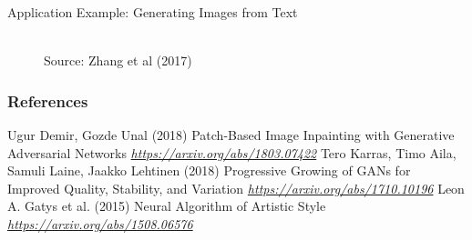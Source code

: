  \begin{frame} {Application Example: Generating Images from Text}
   
     \begin{figure}
     \centering
     \tiny{\\Source: Zhang et al (2017)}
     \end{figure}

 \end{frame}




\begin{vbframe}
\frametitle{References}
\footnotesize{
\begin{thebibliography}{99}
 Ugur Demir, Gozde Unal (2018)
\newblock Patch-Based Image Inpainting with Generative Adversarial Networks
\newblock \emph{\url{https://arxiv.org/abs/1803.07422}}
 Tero Karras, Timo Aila, Samuli Laine, Jaakko Lehtinen (2018)
\newblock Progressive Growing of GANs for Improved Quality, Stability, and Variation
\newblock \emph{\url{https://arxiv.org/abs/1710.10196}}
 Leon A. Gatys et al. (2015)
\newblock Neural Algorithm of Artistic Style
\newblock \emph{\url{https://arxiv.org/abs/1508.06576}}



\end{thebibliography}
}
\end{vbframe}

\endlecture
